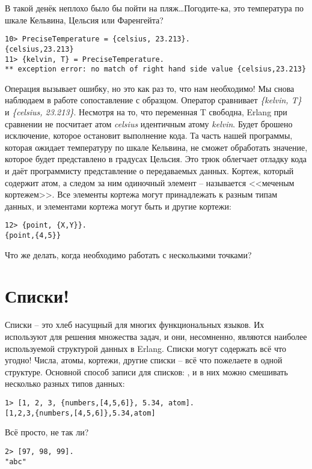 В такой денёк неплохо было бы пойти на пляж\ldots Погодите\--ка, это температура по шкале Кельвина, Цельсия или Фаренгейта?
\begin{lstlisting}[style=repl]
10> PreciseTemperature = {celsius, 23.213}.
{celsius,23.213}
11> {kelvin, T} = PreciseTemperature.
** exception error: no match of right hand side value {celsius,23.213}
\end{lstlisting}

Операция вызывает ошибку, но это как раз то, что нам необходимо! Мы снова наблюдаем в работе сопоставление с образцом.
Оператор \ops{=} сравнивает \emph{\{kelvin, T\}} и \emph{\{celsius, 23.213\}}.
Несмотря на то, что переменная T свободна, Erlang при сравнении не посчитает атом \emph{celsius} идентичным атому \emph{kelvin}.
Будет брошено исключение, которое остановит выполнение кода.
Та часть нашей программы, которая ожидает температуру по шкале Кельвина, не сможет обработать значение, которое будет представлено в градусах Цельсия.
Это трюк облегчает отладку кода и даёт программисту представление о передаваемых данных.
Кортеж, который содержит атом, а следом за ним одиночный элемент \--- называется <<меченым кортежем>>.
Все элементы кортежа могут принадлежать к разным типам данных, и элементами кортежа могут быть и другие кортежи: \begin{lstlisting}[style=repl]
12> {point, {X,Y}}.
{point,{4,5}}
\end{lstlisting}

Что же делать, когда необходимо работать с несколькими точками?
\section{Списки!}\label{lists}
Списки \--- это хлеб насущный для многих функциональных языков.
Их используют для решения множества задач, и они, несомненно, являются наиболее используемой структурой данных в Erlang.
Списки могут содержать всё что угодно!
Числа, атомы, кортежи, другие списки \--- всё что пожелаете в одной структуре.
Основной способ записи для списков: , и в них можно смешивать несколько разных типов данных:
\begin{lstlisting}[style=repl]
1> [1, 2, 3, {numbers,[4,5,6]}, 5.34, atom].
[1,2,3,{numbers,[4,5,6]},5.34,atom]
\end{lstlisting}

Всё просто, не так ли?
\begin{lstlisting}[style=repl]
2> [97, 98, 99].
"abc"
\end{lstlisting}

